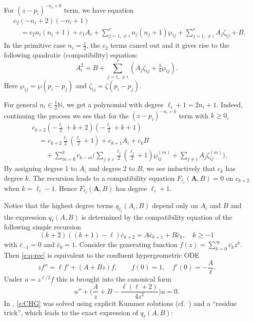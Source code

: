 \documentclass[11pt]{amsart}
\theoremstyle{remark}
\numberwithin{equation}{section}
\begin{document}
For $(z - p_i)^{-n_i + 0}$ term, we have equation
\begin{equation}
\begin{split}
&c_2(-n_i + 2)(-n_i + 1) \\
&\quad = c_2n_i(n_i + 1) + c_1 A_i + \sum_{j = 1, \ne i}^rn_j (n_j + 1) \wp_{ij} + \sum_{j = 1, \neq i}^r A_j \zeta_{ij} + B.
\end{split}
\end{equation}
In the primitive case $n_i=\frac{1}{2}$, the $c_2$ terms cancel out and it gives rise to the following quadratic (compatibility) equation:
\begin{equation} \label{e:log-free}
A_i^2 = B + \sum_{j = 1,\neq i}^r ( A_j \zeta_{ij} + \tfrac{3}{4}\wp_{ij}).
\end{equation}
Here $\wp_{ij} = \wp(p_i-p_j)$ and $\zeta_{ij} = \zeta(p_i-p_j)$.

For general $n_i \in \tfrac{1}{2}\mathbb{N}$, we get a polynomial with degree $\ell_i + 1 = 2n_i +1$. Indeed, continuing the process we see that for the $(z - p_i)^{-n_i + k}$ term with $k \ge 0$,
\begin{equation}
\begin{split}
&c_{k + 2}(-\tfrac{\ell_i}{2} + k + 2)(-\tfrac{\ell_i}{2} + k + 1) \\
&\quad = c_{k + 2}\tfrac{\ell_i}{2}(\tfrac{\ell_i}{2} + 1) + c_{k + 1} A_i + c_k B\\
&\qquad + \sum_{m = 0}^k c_{k - m}\Big(\sum_{j \ne i} \tfrac{\ell_j}{2} (\tfrac{\ell_j}{2} + 1) \wp_{ij}^{(m)} + \sum_{j \ne i} A_j \zeta_{ij}^{(m)} \Big).
\end{split}
\end{equation}
By assigning degree 1 to $A_i$ and degree 2 to $B$, we see inductively that $c_k$ has degree $k$. The recursion leads to a compatibility equation $F_{\ell_i}(\mathbf{A}, B) = 0$ on $c_{k + 2}$ when $k = \ell_i - 1$. Hence $F_{\ell_i} (\mathbf{A}, B)$ has degree $\ell_i + 1$. 

Notice that the highest degree terms $q_{\ell_i}(A_i, B)$ depend only on $A_i$ and $B$ and the expression $q_\ell(A, B)$ is determined by the compatibility equation of the following simple recursion  
\begin{equation} \label{e:q-rec}
(k + 2)((k + 1) - \ell) \bar c_{k + 2} = A \bar c_{k + 1} + B \bar c_k, \quad k \ge -1
\end{equation}
with $\bar c_{-1} = 0$ and $\bar c_0 = 1$. Consider the generating function $f(z) = \sum_{k = 0}^\infty \bar c_k z^k$. Then \eqref{e:q-rec} is equivalent to the confluent hypergeometric ODE
\begin{equation} \label{e:CHG-f}
zf'' = \ell f' + (A + Bz) f, \qquad f(0) = 1,\quad f'(0) = -\frac{A}{\ell}.
\end{equation}
Under $u = z^{\ell/2}f$ this is brought into the canonical form
\begin{equation} \label{e:CHG}
u'' + \Big( \frac{A}{z} + B - \frac{\ell(\ell + 2)}{4z^2}\Big) u = 0.
\end{equation}
In \cite[\S 3.3]{Wang_2020}, \eqref{e:CHG} was solved using explicit Kummer solutions (cf.~\cite[Ch.XVI]{Whittaker_Watson_1996}) and a ``residue trick'', which leads to the exact expression of $q_\ell(A, B)$:
\end{document}
